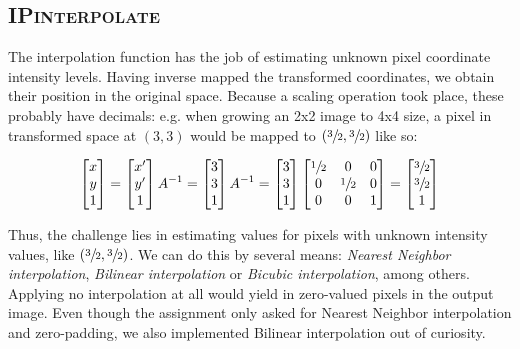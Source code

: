 \documentclass{article}
\begin{document}
\subsection*{\textsc{IPinterpolate}}
The interpolation function has the job of estimating unknown pixel coordinate intensity levels. Having inverse mapped the transformed coordinates, we obtain their position in the original space. Because a scaling operation took place, these probably have decimals: e.g. when growing an 2x2 image to 4x4 size, a pixel in transformed space at $(3, 3)$ would be mapped to $(\sfrac{3}{2}, \sfrac{3}{2})$ like so:

\begin{figure}[ht]
\[ 
\begin{bmatrix}
x \\ y \\ 1
\end{bmatrix} =
\begin{bmatrix}
x' \\ y' \\ 1
\end{bmatrix} A^{-1} =
\begin{bmatrix}
3 \\ 3 \\ 1
\end{bmatrix} A^{-1}=\begin{bmatrix}
3 \\ 3 \\ 1
\end{bmatrix} \begin{bmatrix}
\sfrac{1}{2} & 0 & 0\\
0 & \sfrac{1}{2} & 0\\
0 & 0 & 1
\end{bmatrix}=\begin{bmatrix}\sfrac{3}{2} \\ \sfrac{3}{2} \\ 1
\end{bmatrix}
 \]
\end{figure}

Thus, the challenge lies in estimating values for pixels with unknown intensity values, like $(\sfrac{3}{2}, \sfrac{3}{2})$. We can do this by several means: \textit{Nearest Neighbor interpolation}, \textit{Bilinear interpolation} or \textit{Bicubic interpolation}, among others. Applying no interpolation at all would yield in zero-valued pixels in the output image. Even though the assignment only asked for Nearest Neighbor interpolation and zero-padding, we also implemented Bilinear interpolation out of curiosity.
\end{document}
